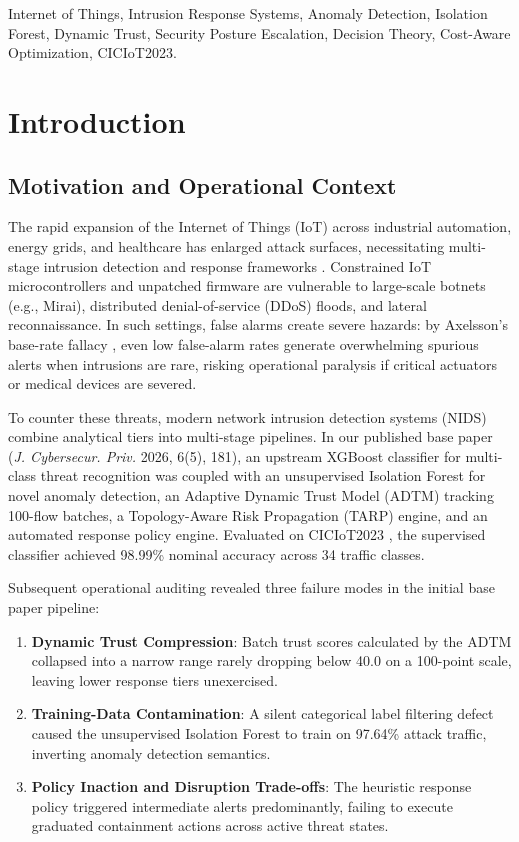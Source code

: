 \documentclass[journal,10pt,onecolumn]{IEEEtran}
\begin{document}
\begin{IEEEkeywords}
Internet of Things, Intrusion Response Systems, Anomaly Detection, Isolation Forest, Dynamic Trust, Security Posture Escalation, Decision Theory, Cost-Aware Optimization, CICIoT2023.
\end{IEEEkeywords}

\section{Introduction}

\subsection{Motivation and Operational Context}
The rapid expansion of the Internet of Things (IoT) across industrial automation, energy grids, and healthcare has enlarged attack surfaces, necessitating multi-stage intrusion detection and response frameworks \cite{1}. Constrained IoT microcontrollers and unpatched firmware are vulnerable to large-scale botnets (e.g., Mirai), distributed denial-of-service (DDoS) floods, and lateral reconnaissance. In such settings, false alarms create severe hazards: by Axelsson's base-rate fallacy \cite{4}, even low false-alarm rates generate overwhelming spurious alerts when intrusions are rare, risking operational paralysis if critical actuators or medical devices are severed.

To counter these threats, modern network intrusion detection systems (NIDS) combine analytical tiers into multi-stage pipelines. In our published base paper \cite{1} (\textit{J. Cybersecur. Priv.} 2026, 6(5), 181), an upstream XGBoost classifier for multi-class threat recognition was coupled with an unsupervised Isolation Forest for novel anomaly detection, an Adaptive Dynamic Trust Model (ADTM) tracking 100-flow batches, a Topology-Aware Risk Propagation (TARP) engine, and an automated response policy engine. Evaluated on CICIoT2023 \cite{3}, the supervised classifier achieved 98.99\% nominal accuracy across 34 traffic classes.

Subsequent operational auditing revealed three failure modes in the initial base paper pipeline:
\begin{enumerate}
    \item \textbf{Dynamic Trust Compression}: Batch trust scores calculated by the ADTM collapsed into a narrow range rarely dropping below 40.0 on a 100-point scale, leaving lower response tiers unexercised.
    \item \textbf{Training-Data Contamination}: A silent categorical label filtering defect caused the unsupervised Isolation Forest to train on 97.64\% attack traffic, inverting anomaly detection semantics.
    \item \textbf{Policy Inaction and Disruption Trade-offs}: The heuristic response policy triggered intermediate alerts predominantly, failing to execute graduated containment actions across active threat states.
\end{enumerate}
\end{document}
